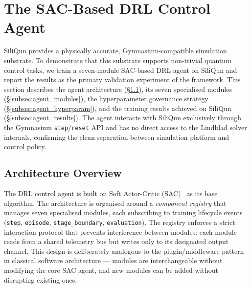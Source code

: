 
\section{The SAC-Based DRL Control Agent}
\label{sec:drl_agent}

SiliQun provides a physically accurate, Gymnasium-compatible simulation substrate.
To demonstrate that this substrate supports non-trivial quantum control tasks,
we train a seven-module SAC-based DRL agent on SiliQun and report the results
as the primary validation experiment of the framework.
This section describes the agent architecture (\S\ref{subsec:agent_arch}),
its seven specialised modules (\S\ref{subsec:agent_modules}),
the hyperparameter governance strategy (\S\ref{subsec:agent_hyperparam}),
and the training results achieved on SiliQun (\S\ref{subsec:agent_results}).
The agent interacts with SiliQun exclusively through the Gymnasium
\texttt{step}/\texttt{reset} API and has no direct access to the Lindblad
solver internals, confirming the clean separation between simulation platform
and control policy.

\subsection{Architecture Overview}
\label{subsec:agent_arch}

The DRL control agent is built on Soft Actor-Critic (SAC)~\cite{Haarnoja2018}
as its base algorithm.
The architecture is organised around a \emph{component registry} that manages
seven specialised modules, each subscribing to training lifecycle events
(\texttt{step}, \texttt{episode}, \texttt{stage\_boundary}, \texttt{evaluation}).
The registry enforces a strict interaction protocol that prevents interference
between modules: each module reads from a shared telemetry bus but writes only
to its designated output channel.
This design is deliberately analogous to the plugin/middleware pattern in
classical software architecture --- modules are interchangeable without modifying
the core SAC agent, and new modules can be added without disrupting existing ones.

